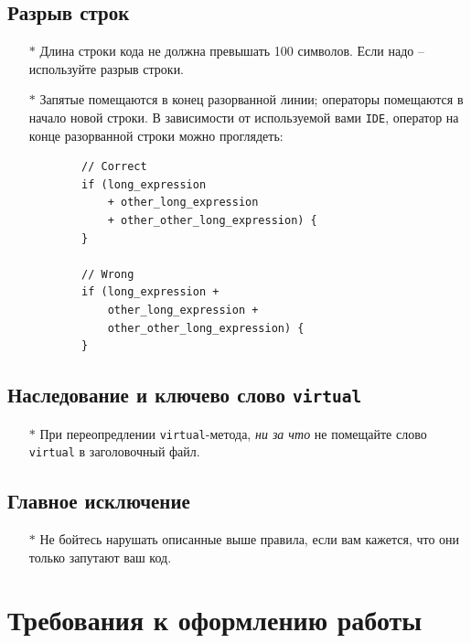 \documentclass[12pt, twoside]{report}
\begin{document}
\subsection*{Разрыв строк}\label{lab_work_formatting_lines}
\begin{itemize}
	\item [$*$] Длина строки кода не должна превышать 100 символов. Если надо -- используйте разрыв строки.
	\item [$*$] Запятые помещаются в конец разорванной линии; операторы помещаются в начало новой строки. В зависимости от используемой вами \texttt{IDE}, оператор на конце разорванной строки можно проглядеть:
	\begin{lstlisting}
		// Correct
		if (long_expression
		    + other_long_expression
			+ other_other_long_expression) {
		}
		
		// Wrong
		if (long_expression +
		    other_long_expression +
			other_other_long_expression) {
		}
	\end{lstlisting}
\end{itemize}

\subsection*{Наследование и ключево слово \texttt{virtual}}\label{lab_work_formatting_virtual}
\begin{itemize}
	\item [$*$] При переопредлении \texttt{virtual}-метода, \emph{ни за что} не помещайте слово \texttt{virtual} в заголовочный файл.
\end{itemize}

\subsection*{Главное исключение}\label{lab_work_formatting_main}
\begin{itemize}
	\item [$*$] Не бойтесь нарушать описанные выше правила, если вам кажется, что они только запутают ваш код.
\end{itemize}


\section*{Требования к оформлению работы}\label{lab_work_}
\end{document}
